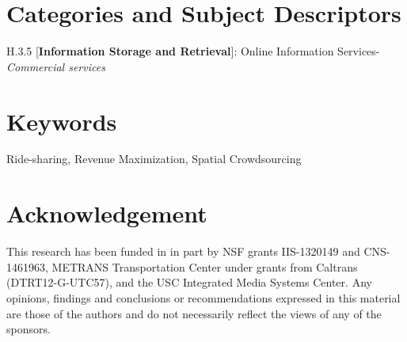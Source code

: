 \documentclass[sigconf]{acmart}
\begin{document}
\vspace{-0.15in}
\section*{Categories and Subject Descriptors}
\vspace{-0.025in}
H.3.5 [\textbf{Information Storage and Retrieval}]: Online Information Services-\textit{Commercial services}

\vspace{-0.1in}
\section*{Keywords}
\vspace{-0.025in}
Ride-sharing, Revenue Maximization, Spatial Crowdsourcing











\section*{Acknowledgement}
This research has been funded in in part by NSF grants IIS-1320149 and CNS-1461963, METRANS Transportation Center under grants from Caltrans (DTRT12-G-UTC57), and the USC Integrated Media Systems Center. Any opinions, findings and conclusions or recommendations expressed in this material are those of the authors and do not necessarily reflect the views of any of the sponsors.

\begin{scriptsize}


\end{scriptsize}
\end{document}
